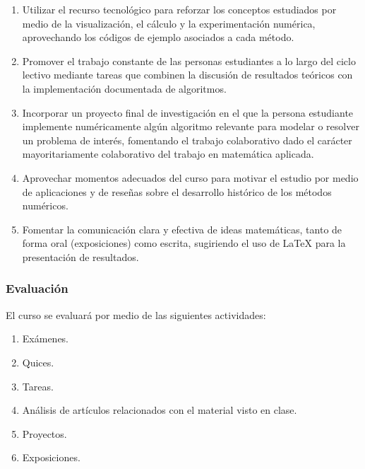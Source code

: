\begin{refsection}
\begin{enumerate}
    \item Utilizar el recurso tecnológico para reforzar los conceptos estudiados por medio de la visualización, el cálculo y la experimentación numérica, aprovechando los códigos de ejemplo asociados a cada método.
    \item Promover el trabajo constante de las personas estudiantes a lo largo del ciclo lectivo mediante tareas que combinen la discusión de resultados teóricos con la implementación documentada de algoritmos.
    \item Incorporar un proyecto final de investigación en el que la persona estudiante implemente numéricamente algún algoritmo relevante para modelar o resolver un problema de interés, fomentando el trabajo colaborativo dado el carácter mayoritariamente colaborativo del trabajo en matemática aplicada.
    \item Aprovechar momentos adecuados del curso para motivar el estudio por medio de aplicaciones y de reseñas sobre el desarrollo histórico de los métodos numéricos.
    \item Fomentar la comunicación clara y efectiva de ideas matemáticas, tanto de forma oral (exposiciones) como escrita, sugiriendo el uso de \LaTeX{} para la presentación de resultados.
\end{enumerate}

\subsubsection*{Evaluación}

El curso se evaluará por medio de las siguientes actividades:

\begin{enumerate}
\item Exámenes.
\item Quices.
\item Tareas.
\item Análisis de artículos relacionados con el material visto en clase.
\item Proyectos.
\item Exposiciones.
\end{enumerate}

\nocite{CalvoSP1306}
\nocite{CalvoMA0501}
\nocite{BS08}
\nocite{Bra07}
\nocite{Eva97}
\nocite{QV08}
\nocite{QSG14}
\nocite{TB97}

\printcursosbibliography
\end{refsection}
